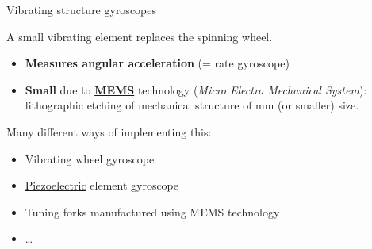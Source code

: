\documentclass[compress]{beamer}
\begin{document}
\begin{frame}{Vibrating structure gyroscopes}

    A small vibrating element replaces the spinning wheel.

    \begin{itemize}

        \item {\bf Measures angular acceleration} (= rate gyroscope)
        \item {\bf Small} due to
            \href{http://en.wikipedia.org/wiki/Microelectromechanical_systems}{\bf
            MEMS} technology (\emph{Micro Electro Mechanical System}): lithographic
            etching of mechanical structure of mm (or smaller) size.

    \end{itemize}

    Many different ways of implementing this:

    \begin{itemize}

        \item Vibrating wheel gyroscope
        \item \href{http://en.wikipedia.org/wiki/Piezoelectric_effect}{Piezoelectric} element gyroscope
        \item Tuning forks manufactured using MEMS technology
        \item \ldots{}
    \end{itemize}

\end{frame}
\end{document}
